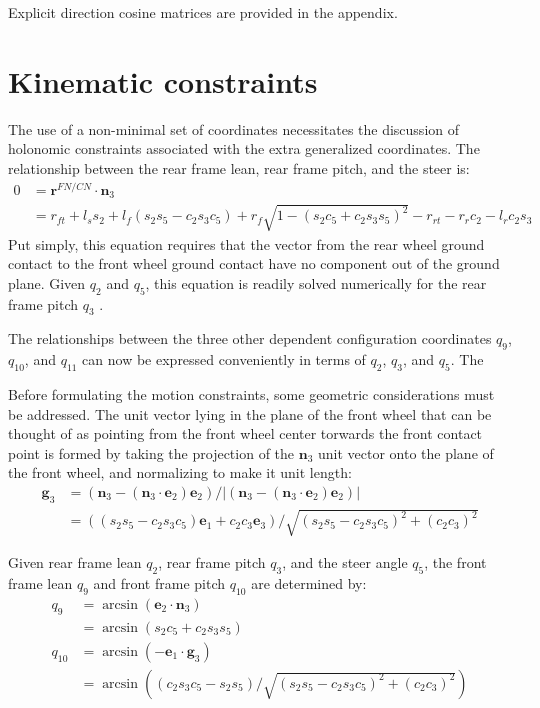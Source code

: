 \documentclass[letterpaper,11pt]{article}
\newcommand{\bs}[1]{ \boldsymbol{ #1 } }
\begin{document}
Explicit direction cosine matrices are provided in the
appendix.

\section*{Kinematic constraints}
The use of a non-minimal set of coordinates necessitates the discussion of
holonomic constraints associated with the extra generalized coordinates.  The
relationship between the rear frame lean, rear frame pitch, and the steer is:
\begin{align*}
0 & =  \bs{r}^{FN/CN} \cdot \bs{n}_3 \\
  & = r_{ft} + l_s s_2 + l_f (s_2 s_5 - c_2 s_3 c_5) +
    r_f \sqrt{1 - (s_2 c_5 + c_2 s_3 s_5)^2} - r_{rt} - r_r c_2 - l_r c_2 s_3
  \label{eq:holonomic}
\end{align*}
Put simply, this equation requires that the vector from the rear wheel ground
contact to the front wheel ground contact have no component out of the ground
plane.  Given $q_2$ and $q_5$, this equation is readily solved numerically for
the rear frame pitch $q_3$ \cite{Peterson2008a}.

The relationships between the three other dependent configuration coordinates
$q_9$, $q_{10}$, and $q_{11}$ can now be expressed conveniently in terms of
$q_2$, $q_3$, and $q_5$.  The

Before formulating the motion constraints, some geometric considerations
must be addressed.  The unit vector lying in the plane of the front wheel that
can be thought of as pointing from the front wheel center torwards the front
contact point is formed by taking the projection of the $\bs{n}_3$ unit vector
onto the plane of the front wheel, and normalizing to make it unit length:
\begin{align*}
  \bs{g}_3 & = (\bs{n}_3 - (\bs{n}_3 \cdot \bs{e}_2) \bs{e}_2) / |(\bs{n}_3 -
  (\bs{n}_3 \cdot \bs{e}_2) \bs{e}_2)| \\
  & = ((s_2 s_5 - c_2 s_3 c_5) \bs{e}_1 + c_2 c_3 \bs{e}_3) / \sqrt{(s_2 s_5 -
  c_2 s_3 c_5)^2 + (c_2 c_3)^2}
\end{align*}

Given rear frame lean $q_2$, rear frame pitch $q_3$, and the steer angle
$q_5$, the front frame lean $q_9$ and front frame pitch $q_{10}$ are determined by:
\begin{align*}
    q_9 & = \arcsin(\bs{e}_2 \cdot \bs{n}_3) \\
    & = \arcsin(s_2 c_5 + c_2 s_3 s_5) \\
    q_{10} & = \arcsin(-\bs{e}_1 \cdot \bs{g}_3) \\
           & = \arcsin((c_2 s_3 c_5 - s_2 s_5) / \sqrt{(s_2 s_5 -
                c_2 s_3 c_5)^2 + (c_2 c_3)^2})
\end{align*}
\end{document}
